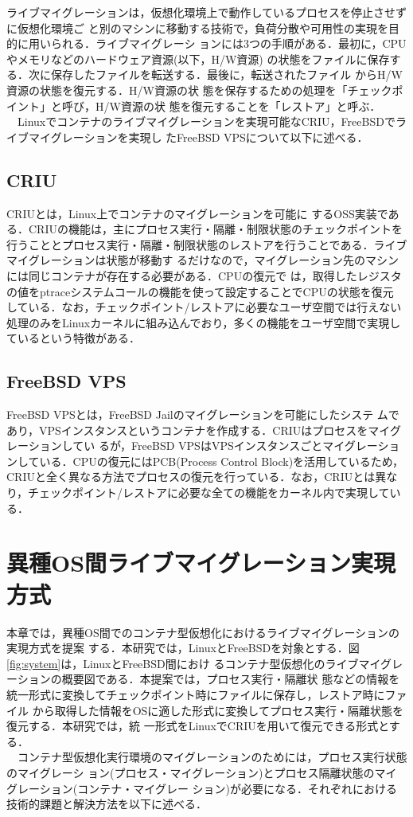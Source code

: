 \documentclass[10pt]{jarticle}
\begin{document}
ライブマイグレーションは，仮想化環境上で動作しているプロセスを停止させずに仮想化環境ご
と別のマシンに移動する技術で，負荷分散や可用性の実現を目的に用いられる．ライブマイグレーシ
ョンには3つの手順がある．最初に，CPUやメモリなどのハードウェア資源(以下，H/W資源)
の状態をファイルに保存する．次に保存したファイルを転送する．最後に，転送されたファイル
からH/W資源の状態を復元する．H/W資源の状
態を保存するための処理を「チェックポイント」と呼び，H/W資源の状
態を復元することを「レストア」と呼ぶ．\\
　Linuxでコンテナのライブマイグレーションを実現可能なCRIU，FreeBSDでライブマイグレーションを実現し
たFreeBSD VPSについて以下に述べる．

\subsection{CRIU}
\label{sec:CRIU}
CRIUとは，Linux上でコンテナのマイグレーションを可能に
するOSS実装である．CRIUの機能は，主にプロセス実行・隔離・制限状態のチェックポイントを行うこととプロセス実行・隔離・制限状態のレストアを行うことである．ライブマイグレーションは状態が移動す
るだけなので，マイグレーション先のマシンには同じコンテナが存在する必要がある．CPUの復元で
は，取得したレジスタの値をptraceシステムコールの機能を使って設定することでCPUの状態を復元
している．なお，チェックポイント/レストアに必要なユーザ空間では行えない処理のみをLinuxカーネルに組み込んでおり，多くの機能をユーザ空間で実現しているという特徴がある．

\subsection{FreeBSD VPS}
\label{sec:FreeBSD VPS}
FreeBSD VPSとは，FreeBSD Jailのマイグレーションを可能にしたシステ
ムであり，VPSインスタンスというコンテナを作成する．CRIUはプロセスをマイグレーションしてい
るが，FreeBSD VPSはVPSインスタンスごとマイグレーションしている．CPUの復元にはPCB(Process
Control Block)を活用しているため，CRIUと全く異なる方法でプロセスの復元を行っている．なお，CRIUとは異なり，チェックポイント/レストアに必要な全ての機能をカーネル内で実現している．

\section{異種OS間ライブマイグレーション実現方式}
\label{sec:suggest}
本章では，異種OS間でのコンテナ型仮想化におけるライブマイグレーションの実現方式を提案
する．本研究では，LinuxとFreeBSDを対象とする．図\ref{fig:system}は，LinuxとFreeBSD間におけ
るコンテナ型仮想化のライブマイグレーションの概要図である．本提案では，プロセス実行・隔離状
態などの情報を統一形式に変換してチェックポイント時にファイルに保存し，レストア時にファイル
から取得した情報をOSに適した形式に変換してプロセス実行・隔離状態を復元する．本研究では，統
一形式をLinuxでCRIUを用いて復元できる形式とする．\\
　コンテナ型仮想化実行環境のマイグレーションのためには，プロセス実行状態のマイグレーシ
ョン(プロセス・マイグレーション)とプロセス隔離状態のマイグレーション(コンテナ・マイグレー
ション)が必要になる．それぞれにおける技術的課題と解決方法を以下に述べる．
\end{document}
